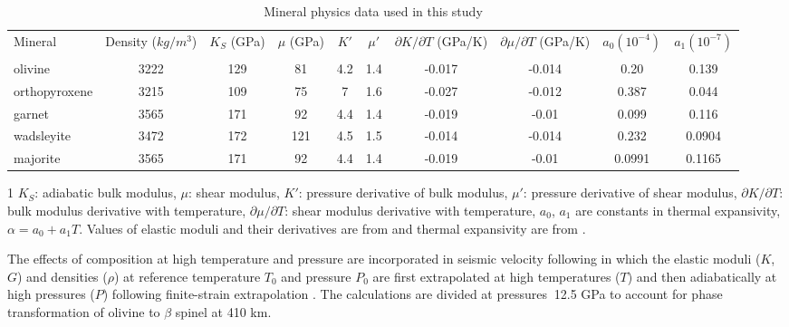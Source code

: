 \documentclass[draft,linenumbers]{agujournal2018}
\begin{document}
\begin{table}
\caption{Mineral physics data used in this study }
\centering
\begin{tabular}{ l c c c c c c c c c } 
\hline
 \multirow{2}{3em}{Mineral} & \multirow{2}{3em}{Density ($kg/m^3$)} & \multirow{2}{3em}{$K_S$ (GPa)} & \multirow{2}{3em}{$\mu$  (GPa)}  & $K'$ & $\mu'$ &  \multirow{2}{4em}{$\partial K/\partial T$ (GPa/K)}  & \multirow{2}{4em}{$\partial \mu/\partial T$ (GPa/K)} & \multirow{2}{4em}{$a_0 (10^{-4})$} & \multirow{2}{4em}{$a_1 (10^{-7})$} \\ & & & & & & & & & \\
 \hline
  olivine  & 3222 & 129 &  81 & 4.2 & 1.4 & -0.017 & -0.014 & 0.20 &  0.139  \\
  orthopyroxene  & 3215 &  109 &  75 & 7 & 1.6 & -0.027 & -0.012 & 0.387 & 0.044 \\
  garnet  &  3565 & 171 & 92 & 4.4 & 1.4 & -0.019 & -0.01 & 0.099 & 0.116 \\
  wadsleyite  & 3472 & 172 & 121 & 4.5 & 1.5 & -0.014 & -0.014 & 0.232 &  0.0904 \\
  majorite  &  3565  & 171 & 92 & 4.4 & 1.4 & -0.019 & -0.01 &  0.0991 & 0.1165   \\
\hline
\end{tabular}
  \begin{tablenotes}
  \begin {small}
     \item[1] $K_S$: adiabatic bulk modulus, $\mu$: shear modulus, $K'$: pressure derivative of bulk modulus, $\mu'$: pressure derivative of shear modulus, $\partial K/\partial T$: bulk modulus derivative with temperature, $\partial \mu/\partial T$: shear modulus derivative with temperature, $a_0$, $a_1$ are constants in thermal expansivity, $\alpha = a_0 + a_1 T$. Values of elastic moduli and their derivatives are from \citet{Cammarano2003} and thermal expansivity are from \citet{saxena_data}.
     \end{small}
  \end{tablenotes}
 \label{table1}
\end{table}

The effects of composition at high temperature and pressure are incorporated in seismic velocity following \citet{Cammarano2003} in which the elastic moduli ($K$, $G$) and densities ($\rho$) at reference temperature $T_0$ and pressure $P_0$ are first extrapolated at high temperatures ($T$) and then adiabatically at high pressures ($P$) following finite-strain extrapolation \citep{duffy1989seismic}. The calculations are divided at pressures $~$12.5 GPa to account for phase transformation of olivine to $\beta$ spinel at 410 km. 
\end{document}
